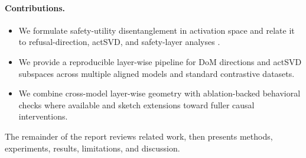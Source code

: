 \paragraph{Contributions.}
\begin{itemize}
  \item We formulate safety-utility disentanglement in activation space and relate it to refusal-direction, actSVD, and safety-layer analyses \cite{arditi2024refusal,wei2024brittleness,li2025safety}.
  \item We provide a reproducible layer-wise pipeline for DoM directions and actSVD subspaces across multiple aligned models and standard contrastive datasets.
  \item We combine cross-model layer-wise geometry with ablation-backed behavioral checks where available and sketch extensions toward fuller causal interventions.
\end{itemize}

The remainder of the report reviews related work, then presents methods, experiments, results, limitations, and discussion.
